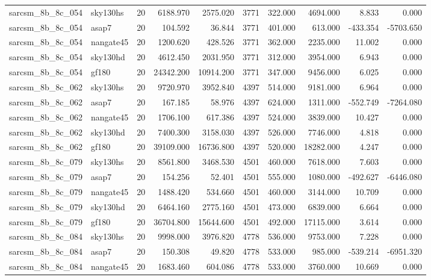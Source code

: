 \documentclass{article}
\begin{document}
\begin{longtable}{llrrrrrrrr}
sarcsm\_8b\_8c\_054 & sky130hs & 20 & 6188.970 & 2575.020 & 3771 & 322.000 & 4694.000 & 8.833 & 0.000 \\
sarcsm\_8b\_8c\_054 & asap7 & 20 & 104.592 & 36.844 & 3771 & 401.000 & 613.000 & -433.354 & -5703.650 \\
sarcsm\_8b\_8c\_054 & nangate45 & 20 & 1200.620 & 428.526 & 3771 & 362.000 & 2235.000 & 11.002 & 0.000 \\
sarcsm\_8b\_8c\_054 & sky130hd & 20 & 4612.450 & 2031.950 & 3771 & 312.000 & 3954.000 & 6.943 & 0.000 \\
sarcsm\_8b\_8c\_054 & gf180 & 20 & 24342.200 & 10914.200 & 3771 & 347.000 & 9456.000 & 6.025 & 0.000 \\
sarcsm\_8b\_8c\_062 & sky130hs & 20 & 9720.970 & 3952.840 & 4397 & 514.000 & 9181.000 & 6.964 & 0.000 \\
sarcsm\_8b\_8c\_062 & asap7 & 20 & 167.185 & 58.976 & 4397 & 624.000 & 1311.000 & -552.749 & -7264.080 \\
sarcsm\_8b\_8c\_062 & nangate45 & 20 & 1706.100 & 617.386 & 4397 & 524.000 & 3839.000 & 10.427 & 0.000 \\
sarcsm\_8b\_8c\_062 & sky130hd & 20 & 7400.300 & 3158.030 & 4397 & 526.000 & 7746.000 & 4.818 & 0.000 \\
sarcsm\_8b\_8c\_062 & gf180 & 20 & 39109.000 & 16736.800 & 4397 & 520.000 & 18282.000 & 4.247 & 0.000 \\
sarcsm\_8b\_8c\_079 & sky130hs & 20 & 8561.800 & 3468.530 & 4501 & 460.000 & 7618.000 & 7.603 & 0.000 \\
sarcsm\_8b\_8c\_079 & asap7 & 20 & 154.256 & 52.401 & 4501 & 555.000 & 1080.000 & -492.627 & -6446.080 \\
sarcsm\_8b\_8c\_079 & nangate45 & 20 & 1488.420 & 534.660 & 4501 & 460.000 & 3144.000 & 10.709 & 0.000 \\
sarcsm\_8b\_8c\_079 & sky130hd & 20 & 6464.160 & 2775.160 & 4501 & 473.000 & 6839.000 & 6.664 & 0.000 \\
sarcsm\_8b\_8c\_079 & gf180 & 20 & 36704.800 & 15644.600 & 4501 & 492.000 & 17115.000 & 3.614 & 0.000 \\
sarcsm\_8b\_8c\_084 & sky130hs & 20 & 9998.000 & 3976.820 & 4778 & 536.000 & 9753.000 & 7.228 & 0.000 \\
sarcsm\_8b\_8c\_084 & asap7 & 20 & 150.308 & 49.820 & 4778 & 533.000 & 985.000 & -539.214 & -6951.320 \\
sarcsm\_8b\_8c\_084 & nangate45 & 20 & 1683.460 & 604.086 & 4778 & 533.000 & 3760.000 & 10.669 & 0.000 \\

\end{longtable}
\end{document}
